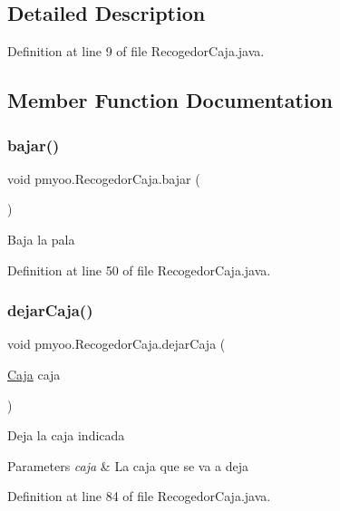 \subsection{Detailed Description}


Definition at line 9 of file Recogedor\+Caja.\+java.



\subsection{Member Function Documentation}
\mbox{\label{classpmyoo_1_1_recogedor_caja_ae7bc7adbd886765db7c73c4c5a1223e8}} 
\subsubsection{\texorpdfstring{bajar()}{bajar()}}
{\footnotesize\ttfamily void pmyoo.\+Recogedor\+Caja.\+bajar (\begin{DoxyParamCaption}{ }\end{DoxyParamCaption})}

Baja la pala 

Definition at line 50 of file Recogedor\+Caja.\+java.

\mbox{\label{classpmyoo_1_1_recogedor_caja_abe6a643d0dfe800a62ca5887454adf5a}} 
\subsubsection{\texorpdfstring{dejarCaja()}{dejarCaja()}}
{\footnotesize\ttfamily void pmyoo.\+Recogedor\+Caja.\+dejar\+Caja (\begin{DoxyParamCaption}\item[{\mbox{\hyperlink{classpmyoo_1_1_caja}{Caja}}}]{caja }\end{DoxyParamCaption})}

Deja la caja indicada 
\begin{DoxyParams}{Parameters}
{\em caja} & La caja que se va a deja \\
\hline
\end{DoxyParams}


Definition at line 84 of file Recogedor\+Caja.\+java.

